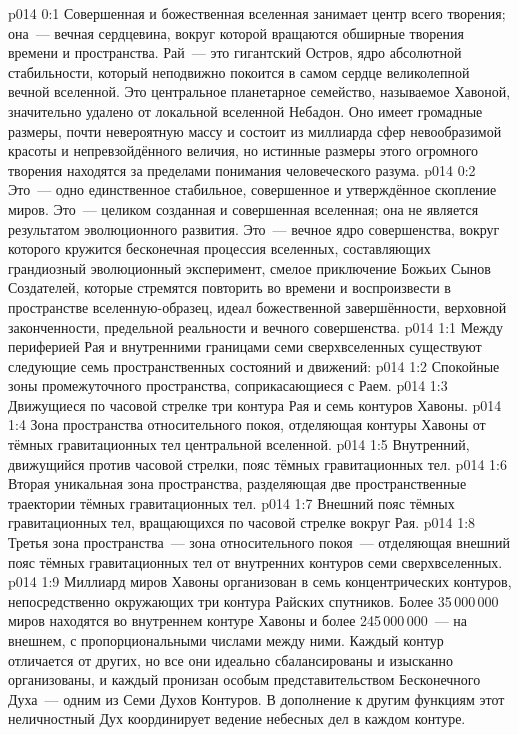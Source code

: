 \author{Совершенствователь Мудрости}
\vs p014 0:1 Совершенная и божественная вселенная занимает центр всего творения; она~--- вечная сердцевина, вокруг которой вращаются обширные творения времени и пространства. Рай~--- это гигантский Остров, ядро абсолютной стабильности, который неподвижно покоится в самом сердце великолепной вечной вселенной. Это центральное планетарное семейство, называемое Хавоной, значительно удалено от локальной вселенной Небадон. Оно имеет громадные размеры, почти невероятную массу и состоит из миллиарда сфер невообразимой красоты и непревзойдённого величия, но истинные размеры этого огромного творения находятся за пределами понимания человеческого разума.
\vs p014 0:2 Это~--- одно единственное стабильное, совершенное и утверждённое скопление миров. Это~--- целиком созданная и совершенная вселенная; она не является результатом эволюционного развития. Это~--- вечное ядро совершенства, вокруг которого кружится бесконечная процессия вселенных, составляющих грандиозный эволюционный эксперимент, смелое приключение Божьих Сынов Создателей, которые стремятся повторить во времени и воспроизвести в пространстве вселенную\hyp{}образец, идеал божественной завершённости, верховной законченности, предельной реальности и вечного совершенства.
\vs p014 1:1 Между периферией Рая и внутренними границами семи сверхвселенных существуют следующие семь пространственных состояний и движений:
\vs p014 1:2 Спокойные зоны промежуточного пространства, соприкасающиеся с Раем.
\vs p014 1:3 Движущиеся по часовой стрелке три контура Рая и семь контуров Хавоны.
\vs p014 1:4 Зона пространства относительного покоя, отделяющая контуры Хавоны от тёмных гравитационных тел центральной вселенной.
\vs p014 1:5 Внутренний, движущийся против часовой стрелки, пояс тёмных гравитационных тел.
\vs p014 1:6 Вторая уникальная зона пространства, разделяющая две пространственные траектории тёмных гравитационных тел.
\vs p014 1:7 Внешний пояс тёмных гравитационных тел, вращающихся по часовой стрелке вокруг Рая.
\vs p014 1:8 Третья зона пространства~--- зона относительного покоя~--- отделяющая внешний пояс тёмных гравитационных тел от внутренних контуров семи сверхвселенных.
\vs p014 1:9 \pc Миллиард миров Хавоны организован в семь концентрических контуров, непосредственно окружающих три контура Райских спутников. Более 35\,000\,000 миров находятся во внутреннем контуре Хавоны и более 245\,000\,000~--- на внешнем, с пропорциональными числами между ними. Каждый контур отличается от других, но все они идеально сбалансированы и изысканно организованы, и каждый пронизан особым представительством Бесконечного Духа~--- одним из Семи Духов Контуров. В дополнение к другим функциям этот неличностный Дух координирует ведение небесных дел в каждом контуре.
